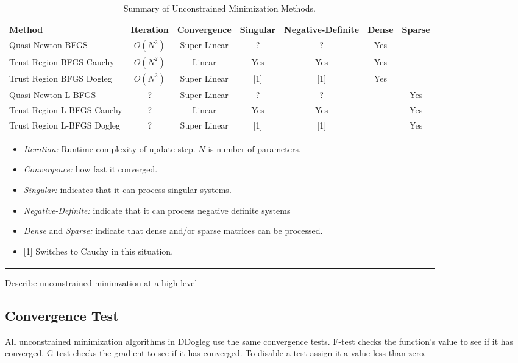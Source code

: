 \documentclass[peerreview,compsoc,onecolumn]{IEEEtran}
\begin{document}
\begin{table}[h]
\caption{\label{summary:UM}Summary of Unconstrained Minimization Methods.}
\centering
\begin{tabular}{lcccccc}
Method & Iteration & Convergence & Singular & Negative-Definite & Dense & Sparse \\[1ex]
\hline
Quasi-Newton BFGS & $O(N^2)$ & Super Linear & ? & ? & Yes &  \rule{0pt}{2.6ex} \\
Trust Region BFGS Cauchy & $O(N^2)$ & Linear & Yes & Yes & Yes &  \\
Trust Region BFGS Dogleg & $O(N^2)$ & Super Linear & [1] & [1] & Yes &  \\
Quasi-Newton L-BFGS & ? & Super Linear & ? & ? &   & Yes \\
Trust Region L-BFGS Cauchy & ? &  Linear & Yes & Yes &  & Yes \\
Trust Region L-BFGS Dogleg & ? &  Super Linear & [1] & [1] &  & Yes \\[1ex]
\hline
\multicolumn{6}{l}{
\begin{minipage}{0.6\textwidth}
\centering
\vspace{2mm}
\begin{itemize}[leftmargin=*]
\item \emph{Iteration:} Runtime complexity of update step. $N$ is number of parameters.
\item \emph{Convergence:} how fast it converged.
\item \emph{Singular:} indicates that it can process singular systems.
\item \emph{Negative-Definite:} indicate that it can process negative definite systems
\item \emph{Dense} and \emph{Sparse:} indicate that dense and/or sparse matrices can be processed. 
\item {[1]} Switches to Cauchy in this situation.
\end{itemize}
\end{minipage}
 }
\end{tabular}
\end{table}

Describe unconstrained minimzation at a high level


\subsection{Convergence Test}

All unconstrained minimization algorithms in DDogleg use the same convergence tests. F-test checks the function's value to see if it has converged. G-test checks the gradient to see if it has converged. To disable a test assign it a value less than zero.
\end{document}
